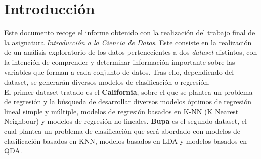 \chapter{Introducción}
Este documento recoge el informe obtenido con la realización del trabajo final de la asignatura \textit{Introducción a la Ciencia de Datos}. Este consiste en la realización de un análisis exploratorio de los datos pertenecientes a dos \textit{dataset} distintos, con la intención de comprender y determinar información importante sobre las variables que forman a cada conjunto de datos. Tras ello, dependiendo del dataset, se generarán diversos modelos de clasificación o regresión.\cite{dataMining} \\

El primer dataset tratado es el \textbf{California}, sobre el que se plantea un problema de regresión y la búsqueda de desarrollar diversos modelos óptimos de regresión lineal simple y múltiple, modelos de regresión basados en K-NN (K Nearest Neighbour) y modelos de regresión no lineales.
\textbf{Bupa} es el segundo dataset, el cual plantea un problema de clasificación que será abordado con modelos de clasificación basados en KNN, modelos basados en LDA y modelos basados en QDA.